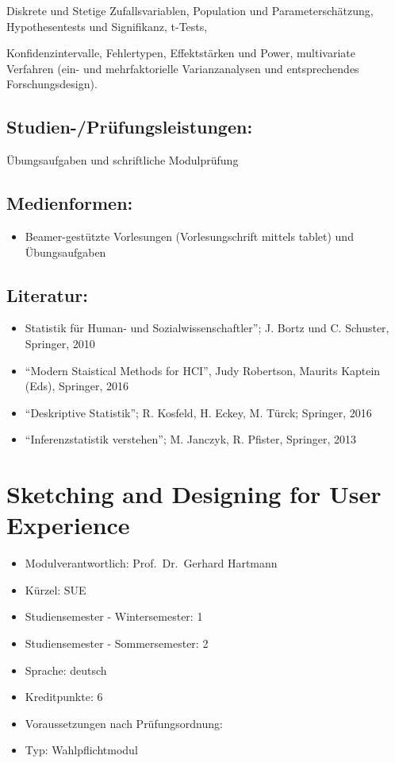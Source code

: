 Diskrete und Stetige Zufallsvariablen, Population und
Parameterschätzung, Hypothesentests und Signifikanz, t-Tests,

Konfidenzintervalle, Fehlertypen, Effektstärken und Power, multivariate
Verfahren (ein- und mehrfaktorielle Varianzanalysen und entsprechendes
Forschungsdesign).

\section*{Studien-/Prüfungsleistungen:}\label{studien-pruxfcfungsleistungen-6}

Übungsaufgaben und schriftliche Modulprüfung

\section*{Medienformen:}\label{medienformen-6}

\begin{itemize}
\tightlist
\item
  Beamer-gestützte Vorlesungen (Vorlesungschrift mittels tablet) und
  Übungsaufgaben
\end{itemize}

\section*{Literatur:}\label{literatur-6}

\begin{itemize}
\item
  Statistik für Human- und Sozialwissenschaftler''; J. Bortz und C.
  Schuster, Springer, 2010
\item
  ``Modern Staistical Methods for HCI'', Judy Robertson, Maurits Kaptein
  (Eds), Springer, 2016
\item
  ``Deskriptive Statistik''; R. Kosfeld, H. Eckey, M. Türck; Springer,
  2016
\item
  ``Inferenzstatistik verstehen''; M. Janczyk, R. Pfister, Springer,
  2013
\end{itemize}

\chapter{Sketching and Designing for User
Experience}\label{sketching-and-designing-for-user-experience}

\begin{itemize}
\tightlist
\item
  Modulverantwortlich: Prof.~Dr.~Gerhard Hartmann
\item
  Kürzel: SUE
\item
  Studiensemester - Wintersemester: 1
\item
  Studiensemester - Sommersemester: 2
\item
  Sprache: deutsch
\item
  Kreditpunkte: 6
\item
  Voraussetzungen nach Prüfungsordnung:
\item
  Typ: Wahlpflichtmodul
\end{itemize}

